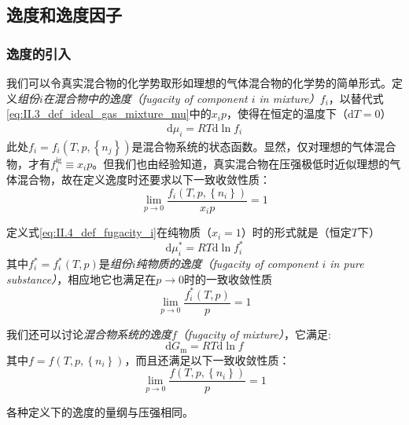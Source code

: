 \documentclass[main.tex]{subfiles}
\begin{document}
\subsection{逸度和逸度因子}
\subsubsection{逸度的引入}
我们可以令真实混合物的化学势取形如理想的气体混合物的化学势的简单形式。定义\emph{组份$i$在混合物中的逸度（fugacity of component $i$ in mixture）}$f_i$，以替代式\eqref{eq:II.3_def_ideal_gas_mixture_mu}中的$x_ip$，使得在恒定的温度下（$\mathrm{d}T=0$）
\begin{align}\label{eq:II.4_def_fugacity_i}
  \mathrm{d}\mu_i=RT\mathrm{d}\ln f_i
\end{align}
此处$f_i=f_i\left(T,p,\left\{n_j\right\}\right)$是混合物系统的状态函数。显然，仅对理想的气体混合物，才有$f_i^\text{ig}\equiv x_i p$。但我们也由经验知道，真实混合物在压强极低时近似理想的气体混合物，故在定义逸度时还要求以下一致收敛性质：
\[\lim_{p\to 0}\frac{f_i\left(T,p,\left\{n_i\right\}\right)}{x_i p}=1\]

定义式\eqref{eq:II.4_def_fugacity_i}在纯物质（$x_i=1$）时的形式就是（恒定$T$下）
\begin{equation}\label{eq:II.4_def_fugacity_i*}
  \mathrm{d}\mu_i^*=RT\mathrm{d}\ln f_i^*
\end{equation}
其中$f_i^*=f_i^*\left(T,p\right)$是\emph{组份$i$纯物质的逸度（fugacity of component $i$ in pure substance）}，相应地它也满足在$p\rightarrow 0$时的一致收敛性质
\[\lim_{p\to 0}\frac{f_i^*\left(T,p\right)}{p}=1\]

我们还可以讨论\emph{混合物系统的逸度$f$（fugacity of mixture）}，它满足:
\begin{equation}\label{eq:II.4_def_fugacity_f}
  \mathrm{d}G_\text{m}=RT\mathrm{d}\ln f
\end{equation}
其中$f=f\left(T,p,\left\{n_i\right\}\right)$，而且还满足以下一致收敛性质：
\[\lim_{p\to 0}\frac{f\left(T,p,\left\{n_i\right\}\right)}{p}=1\]

各种定义下的逸度的量纲与压强相同。
\end{document}
